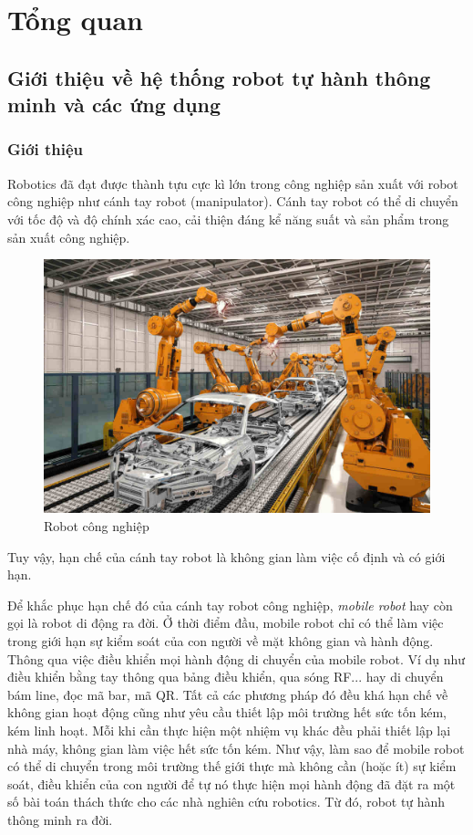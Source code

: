 \chapter{Tổng quan}

\section{Giới thiệu về hệ thống robot tự hành thông minh và các ứng dụng}
\subsection{Giới thiệu}

Robotics đã đạt được thành tựu cực kì lớn trong công nghiệp sản xuất với robot công nghiệp như cánh tay robot (manipulator). Cánh tay robot có thể di chuyển với tốc độ và độ chính xác cao, cải thiện đáng kể năng suất và sản phẩm trong sản xuất công nghiệp.
\cite{siegwart2011introduction}

\begin{figure}[h]
    \centering
    \includegraphics[width=13cm]{chapter1/figs/IndustrialRobot.jpg}
    \caption{Robot công nghiệp}
\end{figure}

Tuy vậy, hạn chế của cánh tay robot là không gian làm việc cố định và có giới hạn.

Để khắc phục hạn chế đó của cánh tay robot công nghiệp, \textit{mobile robot} hay còn gọi là robot di động ra đời. 
Ở thời điểm đầu, mobile robot chỉ có thể làm việc trong giới hạn sự kiểm soát của con người về mặt không gian và hành động. Thông qua việc điều khiển mọi hành động di chuyển của mobile robot. Ví dụ như điều khiển bằng tay thông qua bảng điều khiển, qua sóng RF... hay di chuyển bám line, đọc mã bar, mã QR. Tất cả các phương pháp đó đều khá hạn chế về không gian hoạt động cũng như yêu cầu thiết lập môi trường hết sức tốn kém, kém linh hoạt. Mỗi khi cần thực hiện một nhiệm vụ khác đều phải thiết lập lại nhà máy, không gian làm việc hết sức tốn kém.
Như vậy, làm sao để mobile robot có thể di chuyển trong môi trường thế giới thực mà không cần (hoặc ít) sự kiểm soát, điều khiển của con người để tự nó thực hiện mọi hành động đã đặt ra một số bài toán thách thức cho các nhà nghiên cứu robotics.
Từ đó, robot tự hành thông minh ra đời. 

